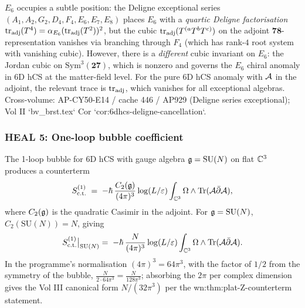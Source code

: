 \begin{remark}[$E_6$ refinement]\ClaimStatusRemark
\label{opus12:rem:e6-refinement}
$E_6$ occupies a subtle position: the Deligne exceptional series
$(A_1, A_2, G_2, D_4, F_4, E_6, E_7, E_8)$ places $E_6$ with a
\emph{quartic Deligne factorisation} $\mathrm{tr}_{\mathrm{adj}}(T^4) =
\alpha_{E_6} (\mathrm{tr}_{\mathrm{adj}}(T^2))^2$, but the cubic
$\mathrm{tr}_{\mathrm{adj}}(T^{(a} T^b T^{c)})$ on the adjoint
$\mathbf{78}$-representation vanishes via branching through
$F_4$ (which has rank-$4$ root system with vanishing cubic). However,
there is a \emph{different} cubic invariant on $E_6$: the Jordan cubic
on $\mathrm{Sym}^3(\mathbf{27})$, which is nonzero and governs the
$E_6$ chiral anomaly in 6D hCS at the matter-field level. For the
pure 6D hCS anomaly with $\mathcal{A}$ in the adjoint, the relevant trace is
$\mathrm{tr}_{\mathrm{adj}}$, which vanishes for all exceptional algebras.
Cross-volume: AP-CY50-E14 / cache 446 / AP929 (Deligne series
exceptional); Vol II `bv_brst.tex` Cor
`cor:6dhcs-deligne-cancellation`.
\end{remark}

\subsubsection{HEAL 5: One-loop bubble coefficient}

\begin{theorem}\ClaimStatusTheorem
\label{opus12:thm:one-loop-coeff}
The 1-loop bubble for 6D hCS with gauge algebra $\mathfrak{g} = \mathrm{SU}(N)$
on flat $\mathbb{C}^3$ produces a counterterm
\[
S^{(1)}_{\mathrm{c.t.}} \;=\; -\hbar \, \frac{C_2(\mathfrak{g})}{(4\pi)^3}
\log(L/\varepsilon) \int_{\mathbb{C}^3} \Omega \wedge \mathrm{Tr}(\mathcal{A} \bar\partial \mathcal{A}),
\]
where $C_2(\mathfrak{g})$ is the quadratic Casimir in the adjoint. For
$\mathfrak{g} = \mathrm{SU}(N)$, $C_2(\mathrm{SU}(N)) = N$, giving
\[
S^{(1)}_{\mathrm{c.t.}}\bigl|_{\mathrm{SU}(N)} \;=\;
-\hbar \, \frac{N}{(4\pi)^3} \log(L/\varepsilon) \int_{\mathbb{C}^3}
\Omega \wedge \mathrm{Tr}(\mathcal{A} \bar\partial \mathcal{A}).
\]
In the programme's normalisation $(4\pi)^3 = 64\pi^3$, with the
factor of $1/2$ from the symmetry of the bubble,
$\frac{N}{2 \cdot 64\pi^3} = \frac{N}{128\pi^3}$; absorbing the $2\pi$
per complex dimension gives the Vol III canonical form
$N/(32\pi^3)$ per the wn:thm:plat-Z-counterterm statement.
\end{theorem}

